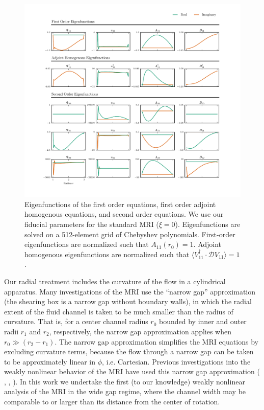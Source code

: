 \documentclass{emulateapj}
\newcommand{\citei}[1]{\citeauthor{#1} \citeyear{#1}}
\begin{document}
\begin{figure}
\centering
\includegraphics[width=\textwidth]{../figures/widegap_orders1_2_Pm16E-7.pdf}
\caption{Eigenfunctions of the first order equations, first order adjoint homogenous equations, and second order equations. We use our fiducial parameters for the standard MRI ($\xi = 0$). Eigenfunctions are solved on a 512-element grid of Chebyshev polynomials. First-order eigenfunctions are normalized such that $A_{11}(r_0) = 1$. Adjoint homogenous eigenfunctions are normalized such that $\langle V_{11}^\dagger \cdot \mathcal{D} V_{11} \rangle = 1$.}\label{fig:linear_eigenfunctions}
\end{figure}

Our radial treatment includes the curvature of the flow in a cylindrical apparatus. Many investigations of the MRI use the ``narrow gap'' approximation (the shearing box is a narrow gap without boundary walls), in which the radial extent of the fluid channel is taken to be much smaller than the radius of curvature. That is, for a center channel radius $r_0$ bounded by inner and outer radii $r_1$ and $r_2$, respectively, the narrow gap approximation applies when $r_0 \gg (r_2 - r_1)$. The narrow gap approximation simplifies the MRI equations by excluding curvature terms, because the flow through a narrow gap can be taken to be approximately linear in $\phi$, i.e. Cartesian. Previous investigations into the weakly nonlinear behavior of the MRI have used this narrow gap approximation (\citei{Umurhan:2007dz}, \citei{Umurhan:2007hs}, \citei{Clark:2016}). In this work we undertake the first (to our knowledge) weakly nonlinear analysis of the MRI in the wide gap regime, where the channel width may be comparable to or larger than its distance from the center of rotation.
\end{document}
